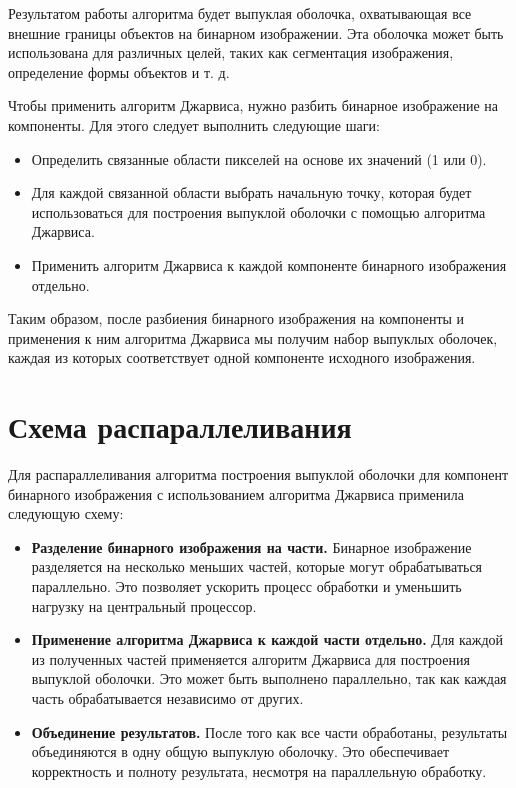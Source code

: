 \documentclass[12pt]{article}
\begin{document}
Результатом работы алгоритма будет выпуклая оболочка, охватывающая все внешние границы объектов на бинарном изображении. Эта оболочка может быть использована для различных целей, таких как сегментация изображения, определение формы объектов и т. д.

Чтобы применить алгоритм Джарвиса, нужно разбить бинарное изображение на компоненты. Для этого следует выполнить следующие шаги:
\begin{itemize}
\item Определить связанные области пикселей на основе их значений (1 или 0).
\item Для каждой связанной области выбрать начальную точку, которая будет использоваться для построения выпуклой оболочки с помощью алгоритма Джарвиса.
\item Применить алгоритм Джарвиса к каждой компоненте бинарного изображения отдельно.
\end{itemize}
Таким образом, после разбиения бинарного изображения на компоненты и применения к ним алгоритма Джарвиса мы получим набор выпуклых оболочек, каждая из которых соответствует одной компоненте исходного изображения.

\section*{Схема распараллеливания}

Для распараллеливания алгоритма построения выпуклой оболочки для компонент бинарного изображения с использованием алгоритма Джарвиса применила следующую схему:
\begin{itemize}
    \item \textbf{Разделение бинарного изображения на части.}
          Бинарное изображение разделяется на несколько меньших частей, которые могут обрабатываться параллельно. Это позволяет ускорить процесс обработки и уменьшить нагрузку на центральный процессор.

    \item \textbf{Применение алгоритма Джарвиса к каждой части отдельно.}
          Для каждой из полученных частей применяется алгоритм Джарвиса для построения выпуклой оболочки. Это может быть выполнено параллельно, так как каждая часть обрабатывается независимо от других.

    \item \textbf{Объединение результатов.}
          После того как все части обработаны, результаты объединяются в одну общую выпуклую оболочку. Это обеспечивает корректность и полноту результата, несмотря на параллельную обработку.
\end{itemize}
\end{document}
